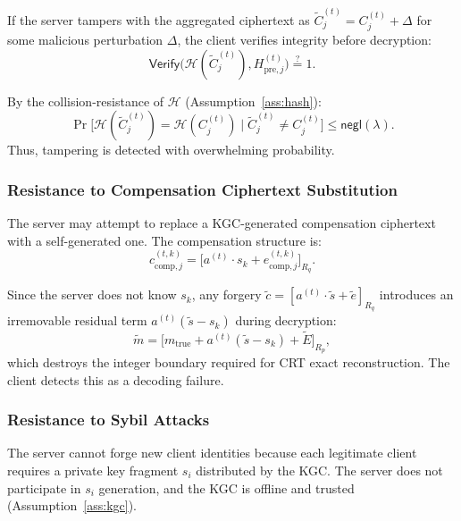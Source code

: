 If the server tampers with the aggregated ciphertext as $\tilde{C}_j^{(t)} = C_j^{(t)} + \Delta$ for some malicious perturbation $\Delta$, the client verifies integrity before decryption:
\begin{equation}
    \mathsf{Verify}\bigl(\mathcal{H}(\tilde{C}_j^{(t)}), H_{\mathrm{pre},j}^{(t)}\bigr) \stackrel{?}{=} 1.
\end{equation}

By the collision-resistance of $\mathcal{H}$ (Assumption~\ref{ass:hash}):
\begin{equation}
    \Pr\bigl[\mathcal{H}(\tilde{C}_j^{(t)}) = \mathcal{H}(C_j^{(t)}) \mid \tilde{C}_j^{(t)} \neq C_j^{(t)}\bigr] \leq \mathsf{negl}(\lambda).
\end{equation}
Thus, tampering is detected with overwhelming probability.

\subsubsection{Resistance to Compensation Ciphertext Substitution}

The server may attempt to replace a KGC-generated compensation ciphertext with a self-generated one. The compensation structure is:
\begin{equation}
    c_{\mathrm{comp},j}^{(t,k)} = \bigl[ a^{(t)} \cdot s_k + e_{\mathrm{comp},j}^{(t,k)} \bigr]_{R_q}.
\end{equation}

Since the server does not know $s_k$, any forgery $\tilde{c} = [a^{(t)} \cdot \tilde{s} + \tilde{e}]_{R_q}$ introduces an irremovable residual term $a^{(t)}(\tilde{s} - s_k)$ during decryption:
\begin{equation}
    \tilde{m} = \bigl[ m_{\mathrm{true}} + a^{(t)}(\tilde{s} - s_k) + \tilde{E} \bigr]_{R_p},
\end{equation}
which destroys the integer boundary required for CRT exact reconstruction. The client detects this as a decoding failure.

\subsubsection{Resistance to Sybil Attacks}

The server cannot forge new client identities because each legitimate client requires a private key fragment $s_i$ distributed by the KGC. The server does not participate in $s_i$ generation, and the KGC is offline and trusted (Assumption~\ref{ass:kgc}).

